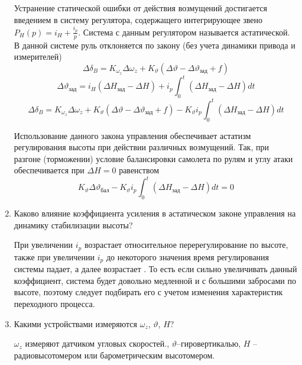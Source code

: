 \begin{enumerate}
                        Устранение   статической   ошибки   от   действия   возмущений   достигается введением в систему регулятора, содержащего интегрирующее звено $P_H(p)=i_H+\frac{i_p}{p}$. Система с данным  регулятором называется астатической. В данной системе руль отклоняется по закону (без учета динамики привода и измерителей)
                        $$\Delta\delta_B=K_{\omega_z}\Delta\omega_z+K_{\vartheta}(\Delta\vartheta-\Delta\vartheta_\text{зад}+f)$$
                        $$\Delta\vartheta_{\text{зад}} = i_H(\Delta H_{\text{зад}}-\Delta H)+i_p\int_{0}^{t}(\Delta H_{\text{зад}}-\Delta H)dt$$
                         $$\Delta\delta_B=K_{\omega_z}\Delta\omega_z+K_{\vartheta}(\Delta\vartheta-\Delta\vartheta_\text{зад}+f)-K_{\vartheta} i_p\int_{0}^{t}(\Delta H_{\text{зад}}-\Delta H)dt$$
                         
                         Использование данного закона управления обеспечивает астатизм регулирования высоты при действии различных возмущений. Так, при разгоне (торможении) условие балансировки самолета по рулям и углу атаки обеспечивается при $\Delta H = 0$ равенством
                         $$K_{\vartheta} \Delta \vartheta_{\text{бал}}-K_{\vartheta} i_p\int_{0}^{t}(\Delta H_{\text{зад}}-\Delta H)dt = 0$$
                         \item Каково влияние коэффициента усиления   в астатическом законе управления на динамику стабилизации высоты?
                         
                         При увеличении  $i_p$  возрастает относительное перерегулирование по высоте, также при увеличении $i_p$  до  некоторого значения время регулирования системы падает, а  далее возрастает . То есть если сильно увеличивать данный коэффициент, система будет довольно медленной и с большими забросами по высоте, поэтому следует подбирать его с учетом изменения характеристик переходного процесса.
                         \item Какими устройствами измеряются $\omega_z$, $\vartheta$, $H$?
                         
                         $\omega_z$ измеряют датчиком угловых скоростей., $\vartheta$--гировертикалью, $H$ --радиовысотомером или барометрическим высотомером.  
                    \end{enumerate}